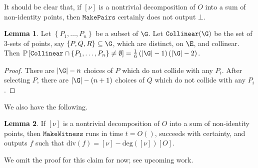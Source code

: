 \documentclass[11pt,letterpaper]{article}
\theoremstyle{definition}
\newtheorem{lemm}{Lemma}[section]
\newcommand{\6}{\mathbf}
\newcommand{\7}{\mathcal}
\begin{document}
It should be clear that, if $[\nu]$ is a nontrivial decomposition of $O$ into a sum of non-identity points, then $\texttt{MakePairs}$ certainly does not output $\bot$. 

\begin{lemm}
\label{lem:number_collinear_triples}
Let $\left\{P_1, \ldots, P_n\right\}$ be a subset of $\G$. Let $\texttt{Collinear}(\G)$ be the set of $3$-sets of points, say $\left\{P, Q, R\right\} \subseteq \G$, which are distinct, on $\E$, and collinear.
Then $\mathbb{P}\left[\texttt{Collinear} \cap \left\{P_1, \ldots, P_n\right\} \neq \emptyset\right] = \frac{1}{6}\left(\left|\G\right|-1\right)\left(\left|\G\right|-2\right)$.
\end{lemm}
\begin{proof}
There are $\left|\G\right| - n$ choices of $P$ which do not collide with any $P_i$. After selecting $P$, there are $\left|\G\right| - (n+1)$ choices of $Q$ which do not collide with any $P_i$. 
\end{proof}

We also have the following.

\begin{lemm}
\label{lem:witnessCorrectness}
If $[\nu]$ is a nontrivial decomposition of $O$ into a sum of non-identity points, then $\texttt{MakeWitness}$ runs in time $t = O()$, succeeds with certainty, and outputs $f$ such that $\text{div}(f) = [\nu] - \text{deg}([\nu])[O]$.
\end{lemm}


We omit the proof for this claim for now; see upcoming work. 
\end{document}
